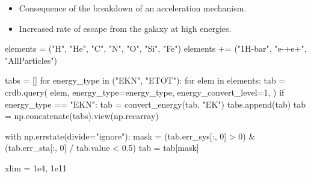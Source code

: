 \documentclass[
  letterpaper,
  DIV=11,
  numbers=noendperiod]{scrreprt}
\newenvironment{Shaded}{\begin{snugshade}}{\end{snugshade}}
\newcommand{\ControlFlowTok}[1]{\textcolor[rgb]{0.00,0.23,0.31}{#1}}
\newcommand{\DecValTok}[1]{\textcolor[rgb]{0.68,0.00,0.00}{#1}}
\newcommand{\FloatTok}[1]{\textcolor[rgb]{0.68,0.00,0.00}{#1}}
\newcommand{\KeywordTok}[1]{\textcolor[rgb]{0.00,0.23,0.31}{#1}}
\newcommand{\NormalTok}[1]{\textcolor[rgb]{0.00,0.23,0.31}{#1}}
\newcommand{\OperatorTok}[1]{\textcolor[rgb]{0.37,0.37,0.37}{#1}}
\newcommand{\StringTok}[1]{\textcolor[rgb]{0.13,0.47,0.30}{#1}}
\providecommand{\tightlist}{%
  \setlength{\itemsep}{0pt}\setlength{\parskip}{0pt}}\usepackage{longtable,booktabs,array}
\begin{document}
\begin{itemize}
\tightlist
\item
  Consequence of the breakdown of an acceleration mechanism.
\item
  Increased rate of escape from the galaxy at high energies.
\end{itemize}

\begin{Shaded}
\begin{Highlighting}[]
\NormalTok{elements }\OperatorTok{=}\NormalTok{ (}\StringTok{"H"}\NormalTok{, }\StringTok{"He"}\NormalTok{, }\StringTok{"C"}\NormalTok{, }\StringTok{"N"}\NormalTok{, }\StringTok{"O"}\NormalTok{, }\StringTok{"Si"}\NormalTok{, }\StringTok{"Fe"}\NormalTok{)}
\NormalTok{elements }\OperatorTok{+=}\NormalTok{ (}\StringTok{"1H{-}bar"}\NormalTok{, }\StringTok{"e{-}+e+"}\NormalTok{, }\StringTok{"AllParticles"}\NormalTok{)}

\NormalTok{tabs }\OperatorTok{=}\NormalTok{ []}
\ControlFlowTok{for}\NormalTok{ energy\_type }\KeywordTok{in}\NormalTok{ (}\StringTok{"EKN"}\NormalTok{, }\StringTok{"ETOT"}\NormalTok{):}
    \ControlFlowTok{for}\NormalTok{ elem }\KeywordTok{in}\NormalTok{ elements:}
\NormalTok{        tab }\OperatorTok{=}\NormalTok{ crdb.query(}
\NormalTok{            elem,}
\NormalTok{            energy\_type}\OperatorTok{=}\NormalTok{energy\_type,}
\NormalTok{            energy\_convert\_level}\OperatorTok{=}\DecValTok{1}\NormalTok{,}
\NormalTok{        )}
        \ControlFlowTok{if}\NormalTok{ energy\_type }\OperatorTok{==} \StringTok{"EKN"}\NormalTok{:}
\NormalTok{            tab }\OperatorTok{=}\NormalTok{ convert\_energy(tab, }\StringTok{"EK"}\NormalTok{)}
\NormalTok{        tabs.append(tab)}
\NormalTok{tab }\OperatorTok{=}\NormalTok{ np.concatenate(tabs).view(np.recarray)}

\ControlFlowTok{with}\NormalTok{ np.errstate(divide}\OperatorTok{=}\StringTok{"ignore"}\NormalTok{):}
\NormalTok{    mask }\OperatorTok{=}\NormalTok{ (tab.err\_sys[:, }\DecValTok{0}\NormalTok{] }\OperatorTok{\textgreater{}} \DecValTok{0}\NormalTok{) }\OperatorTok{\&}\NormalTok{ (tab.err\_sta[:, }\DecValTok{0}\NormalTok{] }\OperatorTok{/}\NormalTok{ tab.value }\OperatorTok{\textless{}} \FloatTok{0.5}\NormalTok{)}
\NormalTok{tab }\OperatorTok{=}\NormalTok{ tab[mask]}

\NormalTok{xlim }\OperatorTok{=} \FloatTok{1e4}\NormalTok{, }\FloatTok{1e11}


\end{Highlighting}
\end{Shaded}
\end{document}
